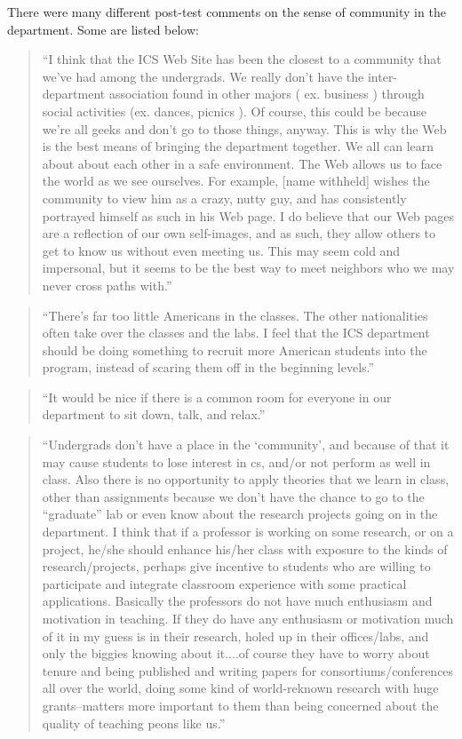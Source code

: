 There were many different post-test comments on the sense of community in the
department.  Some are listed below:

\begin{quote}
``I think that the ICS Web Site has been the closest to a community that we've
had among the undergrads.  We really don't have the inter-department
association found in other majors ( ex. business ) through social activities
(ex. dances, picnics ).  Of course, this could be because we're all geeks and
don't go to those things, anyway.  This is why the Web is the best means of
bringing the department together.  We all can learn about about each other in a
safe environment.  The Web allows us to face the world as we see ourselves.
For example, [name withheld] wishes the community to view him as a crazy, nutty
guy, and has consistently portrayed himself as such in his Web page.  I do
believe that our Web pages are a reflection of our own self-images, and as
such, they allow others to get to know us without even meeting us.  This may
seem cold and impersonal, but it seems to be the best way to meet neighbors who
we may never cross paths with.''
\end{quote}

\begin{quote}
``There's far too little Americans in the classes.  The other nationalities
often take over the classes and the labs.  I feel that the ICS department
should be doing something to recruit more American students into the program,
instead of scaring them off in the beginning levels.''
\end{quote}

\begin{quote}
``It would be nice if there is a common room for everyone in our department to
sit down, talk, and relax.''
\end{quote}

\begin{quote}
``Undergrads don't have a place in the `community', and because of that it may
cause students to lose interest in cs, and/or not perform as well in class.
Also there is no opportunity to apply theories that we learn in class, other
than assignments because we don't have the chance to go to the ``graduate'' lab
or even know about the research projects going on in the department.  I think
that if a professor is working on some research, or on a project, he/she should
enhance his/her class with exposure to the kinds of research/projects, perhaps
give incentive to students who are willing to participate and integrate
classroom experience with some practical applications.  Basically the
professors do not have much enthusiasm and motivation in teaching.  If they do
have any enthusiasm or motivation much of it in my guess is in their research,
holed up in their offices/labs, and only the biggies knowing about it....of
course they have to worry about tenure and being published and writing papers
for consortiums/conferences all over the world, doing some kind of
world-reknown research with huge grants--matters more important to them than
being concerned about the quality of teaching peons like us.''
\end{quote}

